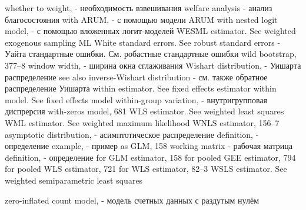 whether to weight, - необходимость взвешивания
welfare analysis - анализ благосостояния
with ARUM, - с помощью модели ARUM
with nested logit model, - с помощью вложенных логит-моделей
WESML estimator. See weighted exogenous sampling ML
White standard errors. See robust standard errors - Уайта стандартные ошибки. См. робастные стандартные ошибки
wild bootstrap, 377–8
window width, - ширина окна сглаживания
Wishart distribution, - Уишарта распределение
see also inverse-Wishart distribution - см. также обратное распределение Уишарта
within estimator. See fixed effects estimator
within model. See fixed effects model
within-group variation, - внутригрупповая диспрерсия
with-zeros model, 681
WLS estimator. See weighted least squares
WML estimator. See weighted maximum likelihood WNLS estimator, 156–7
asymptotic distribution, - асимптотическое распределение
definition, - определение
example, - пример
as GLM, 158
working matrix - рабочая матрица
definition, - определение
for GLM estimator, 158
for pooled GEE estimator, 794 
for pooled WLS estimator, 721 
for WLS estimator, 82–3
WSLS estimator. See weighted semiparametric least squares

zero-inflated count model, - модель счетных данных с раздутым нулём

